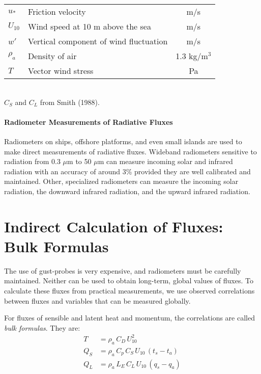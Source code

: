 \begin{table}[t!]
\begin{tabular*}{121mm}{@{}llc@{}}
$u_*$    &  Friction velocity                              & m/s                                      \\
$U_{10}$ &  Wind speed at 10 m above the sea               & m/s                                      \\
$w'$     &  Vertical component of wind fluctuation         & m/s                                      \\
$\rho_a$   &  Density of air                                 & 1.3 kg/m$^{3}$                           \\
$T$      &  Vector wind stress                             &
Pa                                       \\ [0.5ex]
\hline
\end{tabular*} \\ [0.5ex]
$C_S$ and $C_L$ from Smith (1988).
\vspace {-3ex}
\end{table}

\paragraph{Radiometer Measurements of Radiative Fluxes}
Radiometers
on ships, offshore platforms, and even small islands are used to make
direct measurements of radiative fluxes. Wideband radiometers
sensitive to radiation from 0.3 $\mu$m to 50 $\mu$m can measure
incoming solar and infrared radiation with an
accuracy of around 3\% provided they
are well calibrated and maintained. Other, specialized radiometers can
measure the incoming solar radiation, the downward infrared radiation,
and the upward infrared radiation.

\section{Indirect Calculation of Fluxes: Bulk Formulas}
The use of
gust-probes is very expensive, and radiometers must be carefully
maintained. Neither can be used to obtain long-term, global values of
fluxes. To calculate these fluxes from practical measurements, we use
observed correlations between fluxes and variables that can be
measured globally.

For fluxes of sensible and latent heat and momentum, the correlations
are called \textit{bulk formulas}. They
are:
\begin{subequations}
\begin{align}
T     & = \rho_a \,C_D \, U^{2}_{10} \\
Q_S   & = \rho_a \, C_p \,C_S \, U_{10} \, (t_s - t_a) \\
Q_L   & = \rho_a \,  L_E  \, C_L \, U_{10} \,(q_s - q_a)
\end{align}
\end{subequations}

